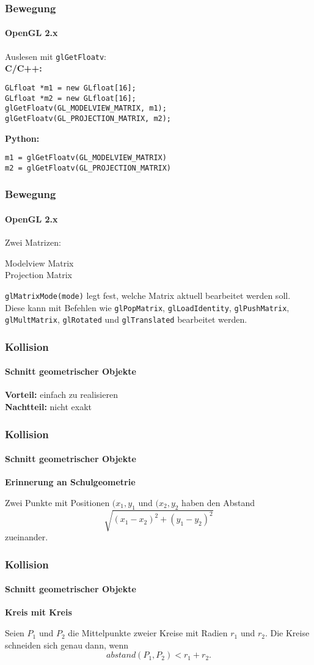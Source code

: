 \documentclass[dvips,12pt,xcolor=table]{beamer}
\begin{document}
\begin{frame}[fragile]
\frametitle{Bewegung}
\framesubtitle{OpenGL 2.x}
Auslesen mit \texttt{glGetFloatv}:\\
\vspace{0.3cm}
\textbf{C/C++:}
\begin{verbatim}
GLfloat *m1 = new GLfloat[16];
GLfloat *m2 = new GLfloat[16];
glGetFloatv(GL_MODELVIEW_MATRIX, m1);
glGetFloatv(GL_PROJECTION_MATRIX, m2);
\end{verbatim}
\vspace{0.3cm}
\textbf{Python:}
\begin{verbatim}
m1 = glGetFloatv(GL_MODELVIEW_MATRIX)
m2 = glGetFloatv(GL_PROJECTION_MATRIX)
\end{verbatim}
\end{frame}

\begin{frame}
\frametitle{Bewegung}
\framesubtitle{OpenGL 2.x}
Zwei Matrizen:
\begin{description}
 \item[Modelview Matrix]
 \item[Projection Matrix]
\end{description}
\texttt{glMatrixMode(mode)} legt fest,
welche Matrix aktuell bearbeitet werden soll.
Diese kann mit Befehlen wie
\texttt{glPopMatrix},
\texttt{glLoadIdentity},
\texttt{glPushMatrix},
\texttt{glMultMatrix},
\texttt{glRotated} und
\texttt{glTranslated}
bearbeitet werden.
\end{frame}


\begin{frame}
\frametitle{Kollision}
\framesubtitle{Schnitt geometrischer Objekte}

\textbf{Vorteil:} einfach zu realisieren \\
\textbf{Nachtteil:} nicht exakt
\end{frame}

\begin{frame}
\frametitle{Kollision}
\framesubtitle{Schnitt geometrischer Objekte}
\textbf{Erinnerung an Schulgeometrie}

Zwei Punkte mit Positionen $(x_{1},y_{1}$ und $(x_{2},y_{2}$
haben den Abstand
\[ \sqrt{(x_{1}-x_{2})^{2} + (y_{1}-y_{2})^{2}} \]
zueinander.
\end{frame}

\begin{frame}
\frametitle{Kollision}
\framesubtitle{Schnitt geometrischer Objekte}
\textbf{Kreis mit Kreis}

Seien $P_{1}$ und $P_{2}$ die Mittelpunkte zweier Kreise
mit Radien $r_{1}$ und $r_{2}$.
Die Kreise schneiden sich genau dann, wenn
\[ abstand(P_{1}, P_{2}) < r_{1} + r_{2}. \]
\end{frame}
\end{document}
